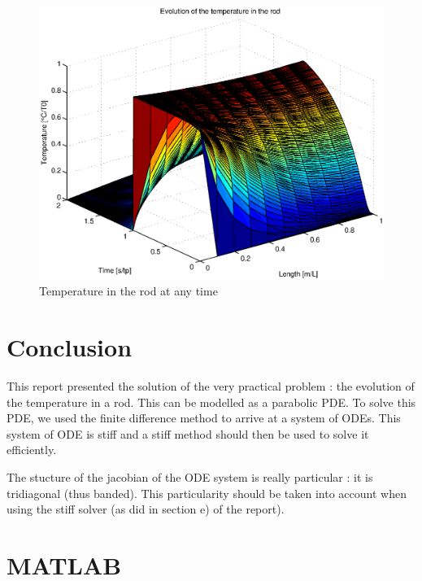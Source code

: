 \begin{figure}
\begin{center}
\includegraphics[scale=0.5]{stable.eps}
\caption{Temperature in the rod at any time}
\label{stable}
\end{center}
\end{figure}

\section*{Conclusion}
This report presented the solution of the very practical problem : the evolution of the temperature in a rod. This can be modelled as a parabolic PDE. To solve this PDE, we used the finite difference method to arrive at a system of ODEs. This system of ODE is stiff and a stiff method should then be used to solve it efficiently.

The stucture of the jacobian of the ODE system is really particular : it is tridiagonal (thus banded). This particularity should be taken into account when using the stiff solver (as did in section e) of the report).

\section*{MATLAB}


